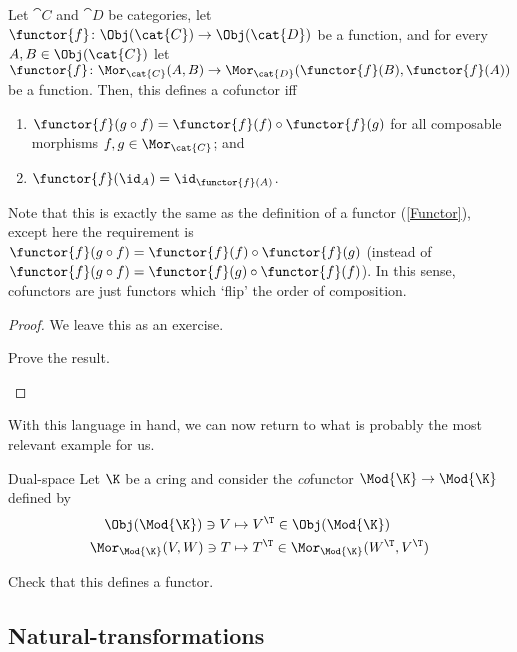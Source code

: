 \begin{prp}{}{}
	Let $\cat{C}$ and $\cat{D}$ be categories, let $\functor{f}\colon \Obj (\cat{C})\rightarrow \Obj (\cat{D})$ be a function, and for every $A,B\in \Obj (\cat{C})$ let $\functor{f}\colon \Mor _{\cat{C}}(A,B)\rightarrow \Mor _{\cat{D}}(\functor{f}(B),\functor{f}(A))$ be a function.  Then, this defines a cofunctor iff
	\begin{enumerate}
		\item $\functor{f}(g\circ f)=\functor{f}(f)\circ \functor{f}(g)$ for all composable morphisms $f,g\in \Mor _{\cat{C}}$; and
		\item $\functor{f}(\id _A)=\id _{\functor{f}(A)}$.
	\end{enumerate}
	\begin{rmk}
		Note that this is exactly the same as the definition of a functor (\cref{Functor}), except here the requirement is $\functor{f}(g\circ f)=\functor{f}(f)\circ \functor{f}(g)$ (instead of $\functor{f}(g\circ f)=\functor{f}(g)\circ \functor{f}(f)$).  In this sense, cofunctors are just functors which `flip' the order of composition.
	\end{rmk}
	\begin{proof}
		We leave this as an exercise.
		\begin{exr}[breakable=false]{}{}
			Prove the result.
		\end{exr}
	\end{proof}
\end{prp}
With this language in hand, we can now return to what is probably the most relevant example for us.
\begin{exm}{Dual-space}{}
	Let $\K$ be a cring and consider the \emph{co}functor $\Mod{\K}\rightarrow \Mod{\K}$ defined by
	\begin{subequations}
		\begin{align}
			\Obj (\Mod{\K})\ni V & \mapsto V^{\T}\in \Obj (\Mod{\K}) \\
			\Mor _{\Mod{\K}}(V,W)\ni T & \mapsto T^{\T}\in \Mor _{\Mod{\K}}(W^{\T},V^{\T})
		\end{align}
	\end{subequations}
	\begin{exr}[breakable=false]{}{}
		Check that this defines a functor.
	\end{exr}
\end{exm}

\subsection{Natural-transformations}\label{sbsB.2.2}

